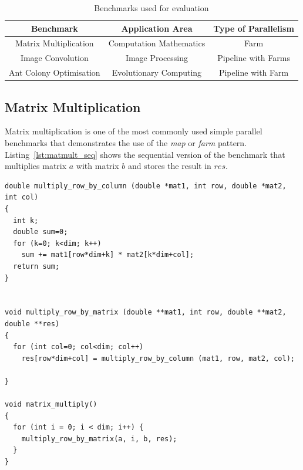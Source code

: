 \begin{table}
\begin{tabular}{|c|c|c|}
  \hline \hline
  \textbf{Benchmark} & \textbf{Application Area} & \textbf{Type of Parallelism} \\
  \hline
  Matrix Multiplication & Computation Mathematics & Farm \\
  Image Convolution & Image Processing & Pipeline with Farms \\
  Ant Colony Optimisation & Evolutionary Computing & Pipeline with Farm \\
  \hline \hline
\end{tabular}
\caption{Benchmarks used for evaluation}
\label{fig:benchmarks}
\end{table}


\subsection{Matrix Multiplication}

\noindent Matrix multiplication is one of the most commonly used simple parallel benchmarks that demonstrates the use of the \emph{map} or \emph{farm} pattern. Listing~\ref{lst:matmult_seq} shows the sequential version of the benchmark that multiplies matrix $a$ with matrix $b$ and stores the result in $res$.

\begin{small}
  \begin{lstlisting}[caption=Sequential Matrix Multiplication\label{lst:matmult_seq}]
double multiply_row_by_column (double *mat1, int row, double *mat2, int col)
{
  int k;
  double sum=0;
  for (k=0; k<dim; k++)
    sum += mat1[row*dim+k] * mat2[k*dim+col];
  return sum;
}


void multiply_row_by_matrix (double **mat1, int row, double **mat2, double **res)
{
  for (int col=0; col<dim; col++)
    res[row*dim+col] = multiply_row_by_column (mat1, row, mat2, col);

}

void matrix_multiply()
{
  for (int i = 0; i < dim; i++) {
    multiply_row_by_matrix(a, i, b, res);
  }
}
  \end{lstlisting}
  
\end{small}

